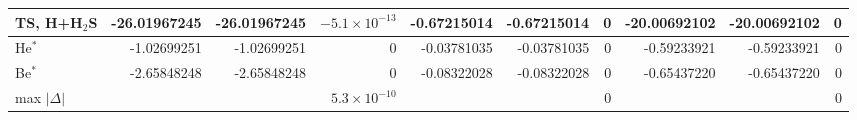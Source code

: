 \begin{tabular}{@{}l rrr rrr rrr@{}}
TS, H+H$_2$S & -26.01967245 & -26.01967245 & \textcolor{green!50!black}{$-5.1\times10^{-13}$} & -0.67215014 & -0.67215014 & \textcolor{green!50!black}{0} & -20.00692102 & -20.00692102 & \textcolor{green!50!black}{0} \\
\midrule
He$^{*}$ & -1.02699251 & -1.02699251 & \textcolor{green!50!black}{0} & -0.03781035 & -0.03781035 & \textcolor{green!50!black}{0} & -0.59233921 & -0.59233921 & \textcolor{green!50!black}{0} \\
Be$^{*}$ & -2.65848248 & -2.65848248 & \textcolor{green!50!black}{0} & -0.08322028 & -0.08322028 & \textcolor{green!50!black}{0} & -0.65437220 & -0.65437220 & \textcolor{green!50!black}{0} \\
\midrule
max $|\Delta|$ & & & \textcolor{green!50!black}{$5.3\times10^{-10}$} & & & \textcolor{green!50!black}{0} & & & \textcolor{green!50!black}{0} \\
\bottomrule
\end{tabular}
